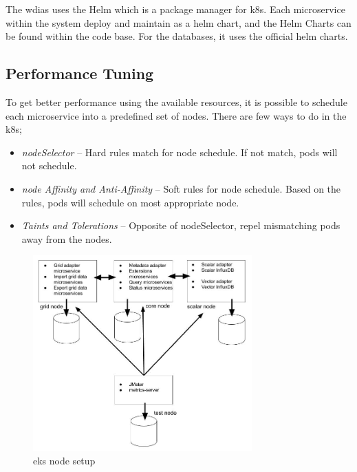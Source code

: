 The \acrshort{wdias} uses the Helm \cite{CNCFHelmDocs} which is a package manager for \acrshort{k8s}. Each microservice within the system deploy and maintain as a helm chart, and the Helm Charts \cite{KarunarathneWdias-helm-charts:Deployments} can be found within the code base. For the databases, it uses the official helm charts.


\subsection{Performance Tuning}
\label{se:performance_tuning}
To get better performance using the available resources, it is possible to schedule each microservice into a predefined set of nodes. There are few ways to do in the \acrshort{k8s};
\begin{itemize}
    \item \emph{nodeSelector} -- Hard rules match for node schedule. If not match, pods will not schedule.
    \item \emph{node Affinity and Anti-Affinity} -- Soft rules for node schedule. Based on the rules, pods will schedule on most appropriate node.
    \item \emph{Taints and Tolerations} -- Opposite of nodeSelector, repel mismatching pods away from the nodes.
\end{itemize}

\begin{figure}[htp]
    \centering
    \includegraphics[width=0.75\textwidth]{results/work_load/eks_node_setup.jpg}
    \caption{\acrfull{eks} node setup}
    \label{fi:eks_node_setup}
\end{figure}

